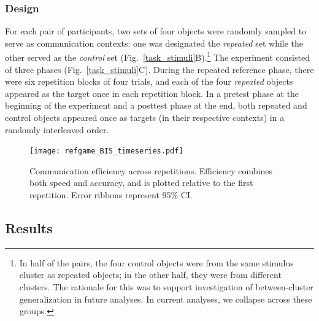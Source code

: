 \subsubsection{Design}
For each pair of participants, two sets of four objects were randomly sampled to serve as communication contexts: one was designated the \emph{repeated} set while the other served as the \emph{control} set (Fig.~\ref{task_stimuli}B).\footnote{In half of the pairs, the four control objects were from the same stimulus cluster as repeated objects; in the other half, they were from different clusters. The rationale for this was to support investigation of between-cluster generalization in future analyses. In current analyses, we collapse across these groups.} %
The experiment consisted of three phases (Fig.~\ref{task_stimuli}C).
During the repeated reference phase, there were six repetition blocks of four trials, and each of the four \emph{repeated} objects appeared as the target once in each repetition block.
In a pretest phase at the beginning of the experiment and a posttest phase at the end, both repeated and control objects appeared once as targets (in their respective contexts) in a randomly interleaved order.

\begin{figure}
\begin{center}
\texttt{[image: refgame\_BIS\_timeseries.pdf]}
\caption{Communication efficiency across repetitions. Efficiency combines both speed and accuracy, and is plotted relative to the first repetition. Error ribbons represent 95\% CI.}
\label{refgame_bis}
\end{center}
\end{figure}

\subsection{Results}

